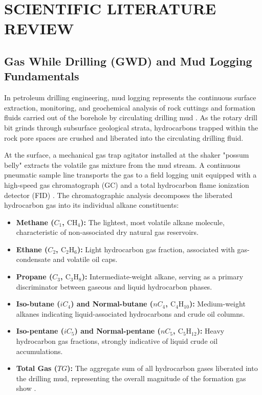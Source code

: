 \chapter{SCIENTIFIC LITERATURE REVIEW}

\section{Gas While Drilling (GWD) and Mud Logging Fundamentals}

In petroleum drilling engineering, mud logging represents the continuous surface extraction, monitoring, and geochemical analysis of rock cuttings and formation fluids carried out of the borehole by circulating drilling mud \citep{ref9, ref12}. As the rotary drill bit grinds through subsurface geological strata, hydrocarbons trapped within the rock pore spaces are crushed and liberated into the circulating drilling fluid.

At the surface, a mechanical gas trap agitator installed at the shaker "possum belly" extracts the volatile gas mixture from the mud stream. A continuous pneumatic sample line transports the gas to a field logging unit equipped with a high-speed gas chromatograph (GC) and a total hydrocarbon flame ionization detector (FID) \citep{ref12, haworth1985}. The chromatographic analysis decomposes the liberated hydrocarbon gas into its individual alkane constituents:
\begin{itemize}
    \item \textbf{Methane ($C_1$, $\text{CH}_4$):} The lightest, most volatile alkane molecule, characteristic of non-associated dry natural gas reservoirs.
    \item \textbf{Ethane ($C_2$, $\text{C}_2\text{H}_6$):} Light hydrocarbon gas fraction, associated with gas-condensate and volatile oil caps.
    \item \textbf{Propane ($C_3$, $\text{C}_3\text{H}_8$):} Intermediate-weight alkane, serving as a primary discriminator between gaseous and liquid hydrocarbon phases.
    \item \textbf{Iso-butane ($iC_4$) and Normal-butane ($nC_4$, $\text{C}_4\text{H}_{10}$):} Medium-weight alkanes indicating liquid-associated hydrocarbons and crude oil columns.
    \item \textbf{Iso-pentane ($iC_5$) and Normal-pentane ($nC_5$, $\text{C}_5\text{H}_{12}$):} Heavy hydrocarbon gas fractions, strongly indicative of liquid crude oil accumulations.
    \item \textbf{Total Gas ($TG$):} The aggregate sum of all hydrocarbon gases liberated into the drilling mud, representing the overall magnitude of the formation gas show \citep{ref14}.
\end{itemize}

